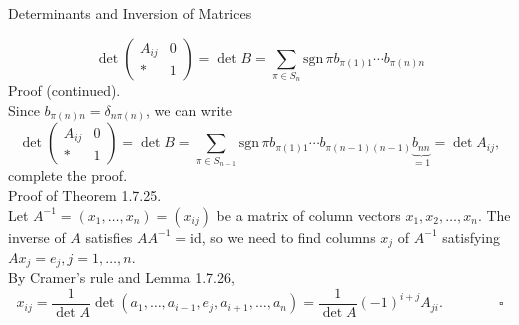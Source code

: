 \documentclass[smaller,hyperref={CJKbookmarks=true}]{beamer}
\newcommand{\myseries}[2]{$#1_1,#1_2,\dots,#1_#2$}
\begin{document}
\begin{frame}{Determinants and Inversion of Matrices}
\begin{spacing}{1.1}
\begin{equation*}
  \det\begin{pmatrix}
        A_{ij} & 0 \\
        * & 1
      \end{pmatrix}=\det B=\sum_{\pi\in S_n}\text{sgn}\,\pi b_{\pi(1)1}\cdots b_{\pi(n)n}
\end{equation*}
\newpage
\alert{Proof (continued).}\\
Since $b_{\pi(n)n}=\delta_{n\pi(n)}$, we can write
\[\det\begin{pmatrix}
        A_{ij} & 0 \\
        * & 1
      \end{pmatrix}=\det B=\sum_{\pi\in S_{n-1}}\text{sgn}\,\pi b_{\pi(1)1}\cdots b_{\pi(n-1)(n-1)}\underbrace{b_{nn}}_{=1}=\det A_{ij},\]
complete the proof.\quad{$\square$}\\
\alert{Proof of Theorem 1.7.25.}\\
Let $A^{-1}=(x_1,\ldots,x_n)=(x_{ij})$ be a matrix of column vectors \myseries{x}{n}. The inverse of $A$ satisfies $AA^{-1}=\text{id}$, so we need to find columns $x_j$ of $A^{-1}$ satisfying $Ax_j=e_j,j=1,\ldots,n$.\\[4pt]
By Cramer's rule and Lemma 1.7.26,
\begin{equation*}
x_{ij}=\frac{1}{\det A}\det(a_1,\ldots,a_{i-1},e_j,a_{i+1},\ldots,a_n)=\frac{1}{\det A}(-1)^{i+j}A_{ji}.\qquad\qquad\square
\end{equation*}
\end{spacing}
\end{frame}
\end{document}
